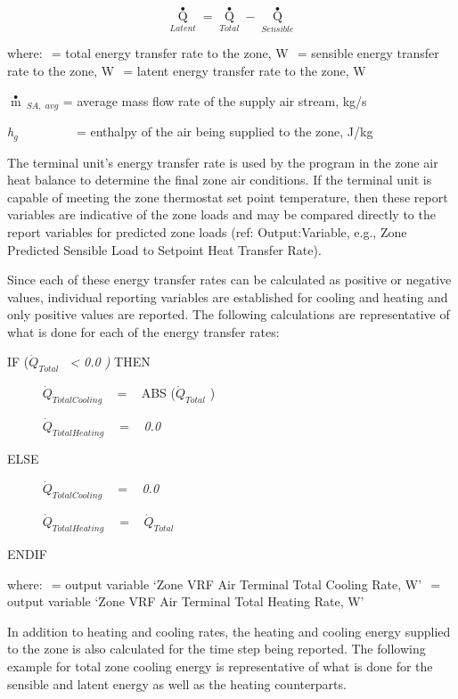 \begin{equation}
{\mathop Q\limits^ \bullet_{Latent}} = {\mathop Q\limits^ \bullet_{Total}} - {\mathop Q\limits^ \bullet_{Sensible}}
\end{equation}

where: \(_{ }\) = total energy transfer rate to the zone, W \(_{ }\) = sensible energy transfer rate to the zone, W \(_{ }\) = latent energy transfer rate to the zone, W

\(\mathop m\limits^ \bullet {\,_{SA,\,\,avg}}\) = average mass flow rate of the supply air stream, kg/s

\emph{h\(_{g}\)} ~~~~~~~~ = enthalpy of the air being supplied to the zone, J/kg

The terminal unit's energy transfer rate is used by the program in the zone air heat balance to determine the final zone air conditions. If the terminal unit is capable of meeting the zone thermostat set point temperature, then these report variables are indicative of the zone loads and may be compared directly to the report variables for predicted zone loads (ref: Output:Variable, e.g., Zone Predicted Sensible Load to Setpoint Heat Transfer Rate).

Since each of these energy transfer rates can be calculated as positive or negative values, individual reporting variables are established for cooling and heating and only positive values are reported. The following calculations are representative of what is done for each of the energy transfer rates:

IF (\({\dot Q_{Total}}\) \emph{~\textless{} 0.0 )} THEN

~~~~~ \({\dot Q_{TotalCooling}}\) ~ = ~ ABS (\({\dot Q_{Total}}\) )

~~~~~ \({\dot Q_{TotalHeating}}\) \(_{ }\)~ = ~ \emph{0.0}

ELSE

~~~~~ \({\dot Q_{TotalCooling}}\) \(_{ }\)~ = ~ \emph{0.0}

~~~~~ \({\dot Q_{TotalHeating}}\) \(_{ }\)~ = ~ \({\dot Q_{Total}}\)

ENDIF

where: \(_{ }\) = output variable `Zone VRF Air Terminal Total Cooling Rate, W' \(_{ }\) = output variable `Zone VRF Air Terminal Total Heating Rate, W'

In addition to heating and cooling rates, the heating and cooling energy supplied to the zone is also calculated for the time step being reported. The following example for total zone cooling energy is representative of what is done for the sensible and latent energy as well as the heating counterparts.

